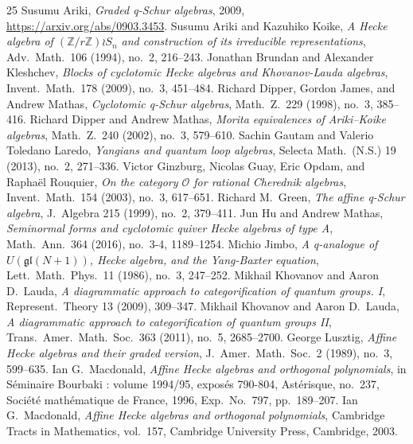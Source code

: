 \begin{thebibliography}{25}
 Susumu Ariki, \emph{Graded q-Schur algebras}, 2009, \url{https://arxiv.org/abs/0903.3453}.
 Susumu Ariki and Kazuhiko Koike, \emph{A Hecke algebra of $(\mathbb{Z}/r\mathbb{Z})\wr S_n$ and construction of its irreducible representations}, Adv.\ Math.\ 106 (1994), no.~2, 216--243.
 Jonathan Brundan and Alexander Kleshchev, \emph{Blocks of cyclotomic Hecke algebras and Khovanov-Lauda algebras}, Invent.\ Math.\ 178 (2009), no.~3, 451--484.
 Richard Dipper, Gordon James, and Andrew Mathas, \emph{Cyclotomic q-Schur algebras}, Math.\ Z.\ 229 (1998), no.~3, 385--416.
 Richard Dipper and Andrew Mathas, \emph{Morita equivalences of Ariki--Koike algebras}, Math.\ Z.\ 240 (2002), no.~3, 579--610.
 Sachin Gautam and Valerio Toledano Laredo, \emph{Yangians and quantum loop algebras}, Selecta Math.\ (N.S.) 19 (2013), no.~2, 271--336.
 Victor Ginzburg, Nicolas Guay, Eric Opdam, and Rapha\"el Rouquier, \emph{On the category $\mathcal{O}$ for rational Cherednik algebras}, Invent.\ Math.\ 154 (2003), no.~3, 617--651.
 Richard M.~Green, \emph{The affine q-Schur algebra}, J.\ Algebra 215 (1999), no.~2, 379--411.
 Jun Hu and Andrew Mathas, \emph{Seminormal forms and cyclotomic quiver Hecke algebras of type A}, Math.\ Ann.\ 364 (2016), no.~3-4, 1189--1254.
 Michio Jimbo, \emph{A q-analogue of $U(\mathfrak{gl}(N+1))$, Hecke algebra, and the Yang-Baxter equation}, Lett.\ Math.\ Phys.\ 11 (1986), no.~3, 247--252.
 Mikhail Khovanov and Aaron D.~Lauda, \emph{A diagrammatic approach to categorification of quantum groups. I}, Represent.\ Theory 13 (2009), 309--347.
 Mikhail Khovanov and Aaron D.~Lauda, \emph{A diagrammatic approach to categorification of quantum groups II}, Trans.\ Amer.\ Math.\ Soc.\ 363 (2011), no.~5, 2685--2700.
 George Lusztig, \emph{Affine Hecke algebras and their graded version}, J.\ Amer.\ Math.\ Soc.\ 2 (1989), no.~3, 599--635.
 Ian G.~Macdonald, \emph{Affine Hecke algebras and orthogonal polynomials}, in S\'eminaire Bourbaki : volume 1994/95, expos\'es 790-804, Ast\'erisque, no.~237, Soci\'et\'e math\'ematique de France, 1996, Exp.\ No.~797, pp.~189--207.
 Ian G.~Macdonald, \emph{Affine Hecke algebras and orthogonal polynomials}, Cambridge Tracts in Mathematics, vol.~157, Cambridge University Press, Cambridge, 2003.

\end{thebibliography}
